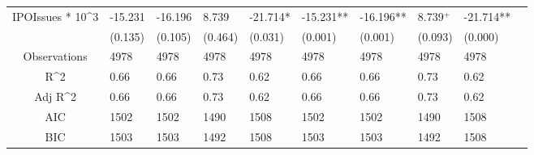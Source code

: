 \documentclass{article}
\begin{document}
\begin{table}[H]
\begin{tabular}{|clllllllll|}
  IPOIssues * 10^3 & -15.231 & -16.196 & 8.739 & -21.714* & -15.231** & -16.196** & 8.739$^{+}$ & -21.714** & \\ 
   & (0.135) & (0.105) & (0.464) & (0.031) & (0.001) & (0.001) & (0.093) & (0.000) & \\ 
  \hline 
 Observations & 4978 & 4978 & 4978 & 4978 & 4978 & 4978 & 4978 & 4978 & \\ 
  R^2 & 0.66 & 0.66 & 0.73 & 0.62 & 0.66 & 0.66 & 0.73 & 0.62 & \\ 
  Adj R^2 & 0.66 & 0.66 & 0.73 & 0.62 & 0.66 & 0.66 & 0.73 & 0.62 & \\ 
  AIC & 1502 & 1502 & 1490 & 1508 & 1502 & 1502 & 1490 & 1508 & \\ 
  BIC & 1503 & 1503 & 1492 & 1508 & 1503 & 1503 & 1492 & 1508 & \\ 
   \hline
\end{tabular}
 
\end{table}
\end{document}

